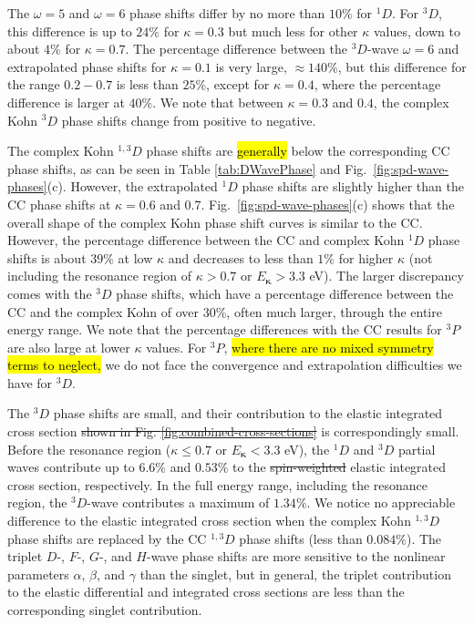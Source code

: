 \documentclass[preprint,showpacs,showkeys,preprintnumbers,amsmath,amssymb,longbibliography,pra,aps]{revtex4-1}
\begin{document}
{The $\omega = 5$ and $\omega = 6$ phase shifts differ by no more than
$10\%$ for $^1D$. For $^3D$, this difference is up to $24\%$ for
$\kappa=0.3$ but much less for other $\kappa$ values, down to
about $4\%$ for $\kappa = 0.7$.
The percentage difference between the $^3D$-wave $\omega = 6$ and extrapolated
phase shifts for $\kappa = 0.1$ is very large,
$\approx 140\%$, but this difference for the range $0.2 - 0.7$
is less than $25\%$, except for $\kappa = 0.4$, where the percentage
difference is larger at $40\%$. We note that between $\kappa = 0.3$
and $0.4$, the complex Kohn $^3D$ phase shifts change from positive 
to negative.

The complex Kohn $^{1,3}D$ phase shifts are \hl{generally} below the corresponding 
CC phase shifts, as can be seen in Table \ref{tab:DWavePhase} and
Fig.~\ref{fig:spd-wave-phases}(c). However, the extrapolated $^1D$ phase shifts
are slightly higher than the CC phase shifts at $\kappa = 0.6$ and 0.7.
Fig.~\ref{fig:spd-wave-phases}(c) shows that the overall shape of the complex Kohn 
phase shift curves is similar to the CC. However, the percentage difference 
between the CC and complex Kohn $^1D$ phase shifts is about $39\%$ at low
$\kappa$ and decreases to less than $1\%$ for higher $\kappa$ (not including 
the resonance region of $\kappa > 0.7$ or $E_{ \bm \kappa} > 3.3$ eV). The 
larger discrepancy comes with the $^3D$ phase shifts, which have a percentage 
difference between the CC and the complex Kohn of over 30\%, often much 
larger, through the entire energy range. We note that the percentage 
differences with the CC results for $^3P$ are also large at lower $\kappa$ 
values. For $^3P$, \hl{where there are no mixed symmetry terms to neglect,}
we do not face the convergence and extrapolation 
difficulties we have for $^3D$.

The $^3D$ phase shifts are small, and their contribution to the elastic
integrated cross section \sout{shown in Fig. \ref{fig:combined-cross-sections}} is
correspondingly small. Before the resonance region
($\kappa \leq 0.7$ or $E_{\bm \kappa} < 3.3$ eV), the
$^1D$ and $^3D$ partial waves contribute up to $6.6\%$ and $0.53\%$ to the
\sout{spin-weighted} elastic integrated cross section, respectively. In the full
energy range, including the resonance region, the $^3D$-wave contributes a maximum of
$1.34\%$. We notice no appreciable difference to the elastic integrated cross
section  when the complex Kohn $^{1,3}D$ phase shifts are replaced by the CC
$^{1,3}D$ phase shifts (less than $0.084\%$). %
The triplet $D$-, $F$-, $G$-, and
$H$-wave phase shifts are more sensitive to the nonlinear parameters
$\alpha$, $\beta$, and $\gamma$ than the 
singlet, but in general, the triplet contribution to the elastic differential 
and integrated cross sections are less than the corresponding singlet 
contribution.

}
\end{document}
